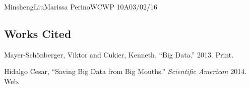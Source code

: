 \documentclass[12pt,letterpaper]{article}
\begin{document}
\begin{mla}{Minsheng}{Liu}{Marissa Perino}{WCWP 10A}{03/02/16}
\subsection*{Works Cited}
\bibent Mayer-Schönberger, Viktor and Cukier, Kenneth. ``Big Data.'' 2013. Print.

\bibent Hidalgo Cesar, ``Saving Big Data from Big Mouths.'' \textit{Scientific American} 2014. Web.

\end{mla}
\end{document}

